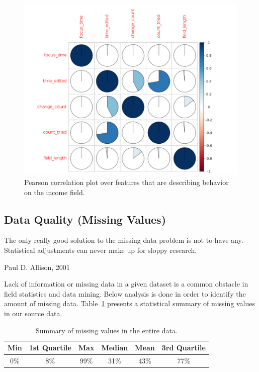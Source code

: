 \begin{figure}[h!]
    \centering
    \includegraphics[scale=0.4]{Graphics/corr-plott.png}
    \caption{Pearson correlation plot over features that are describing behavior on the income field.} %
    \label{fig:corr-plott}
\end{figure}


\subsection{Data Quality (Missing Values)}\label{Ch:2:DataQuality}
\epigraph{The only really good solution to the missing data problem is not to have any. Statistical adjustments can never make up for sloppy research. }{Paul D. Allison, 2001}
\label{intro}

Lack of information or missing data in a given dataset is a common obstacle in field statistics and data mining. Below analysis is done in order to identify the amount of missing data. Table~\ref{tab:missings-over-all} presents a statistical summary of missing values in our source data.
 \begin{table}[h!]
  \begin{center}
    \caption{Summary of missing values in the entire data.}
    \label{tab:missings-over-all}
    \begin{tabular}{c|c|c|c|c|c}
    Min & 1st Quartile & Max & Median & Mean & 3rd Quartile \\
      \hline
     0\% & 8\% & 99\% & 31\% & 43\% & 77\% \\ 
     \hline 
    \end{tabular}
  \end{center}
\end{table}

